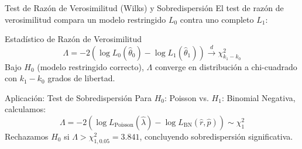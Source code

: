 \documentclass[10pt, aspectratio=169]{beamer}
\begin{document}
\begin{frame}{Test de Razón de Verosimilitud (Wilks) y Sobredispersión}
  \footnotesize
  El test de razón de verosimilitud compara un modelo restringido $L_{0}$ contra uno completo $L_{1}$: \pause

  \vspace{0.1cm}
  \begin{block}{Estadístico de Razón de Verosimilitud}
    $$\Lambda = -2(\log L_{0}(\hat{\theta}_{0}) - \log L_{1}(\hat{\theta}_{1})) \xrightarrow{d} \chi^{2}_{k_{1} - k_{0}}$$
    Bajo $H_{0}$ (modelo restringido correcto), $\Lambda$ converge en distribución a chi-cuadrado con $k_{1} - k_{0}$ grados de libertad.
  \end{block}

  \vspace{0.1cm}
  \pause
  \begin{alertblock}{Aplicación: Test de Sobredispersión}
    Para $H_{0}$: Poisson vs. $H_{1}$: Binomial Negativa, calculamos:
    $$\Lambda = -2(\log L_{\text{Poisson}}(\hat{\lambda}) - \log L_{\text{BN}}(\hat{r}, \hat{p})) \sim \chi^{2}_{1}$$
    Rechazamos $H_{0}$ si $\Lambda > \chi^{2}_{1, 0.05} = 3.841$, concluyendo sobredispersión significativa.
  \end{alertblock}
\end{frame}
\end{document}
